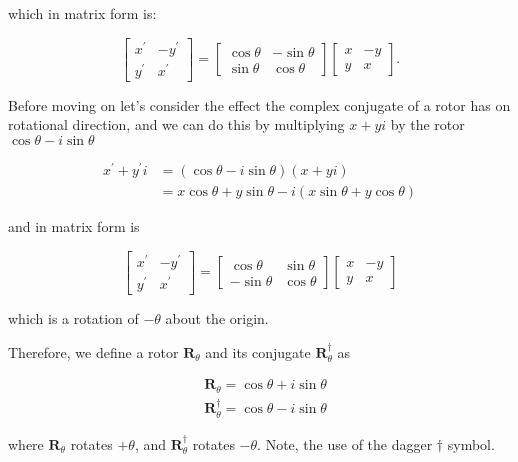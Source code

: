 which in matrix form is:

$$
\left[\begin{array}{cc}
x^{\prime} & -y^{\prime} \\
y^{\prime} & x^{\prime}
\end{array}\right]=\left[\begin{array}{cc}
\cos \theta & -\sin \theta \\
\sin \theta & \cos \theta
\end{array}\right]\left[\begin{array}{cc}
x & -y \\
y & x
\end{array}\right] .
$$

Before moving on let's consider the effect the complex conjugate of a rotor has on rotational direction, and we can do this by multiplying $x+y i$ by the rotor $\cos \theta-i \sin \theta$

$$
\begin{aligned}
x^{\prime}+y^{\prime} i & =(\cos \theta-i \sin \theta)(x+y i) \\
& =x \cos \theta+y \sin \theta-i(x \sin \theta+y \cos \theta)
\end{aligned}
$$

and in matrix form is

$$
\left[\begin{array}{cc}
x^{\prime} & -y^{\prime} \\
y^{\prime} & x^{\prime}
\end{array}\right]=\left[\begin{array}{cc}
\cos \theta & \sin \theta \\
-\sin \theta & \cos \theta
\end{array}\right]\left[\begin{array}{cc}
x & -y \\
y & x
\end{array}\right]
$$

which is a rotation of $-\theta$ about the origin.

Therefore, we define a rotor $\mathbf{R}_{\theta}$ and its conjugate $\mathbf{R}_{\theta}^{\dagger}$ as

$$
\begin{aligned}
& \mathbf{R}_{\theta}=\cos \theta+i \sin \theta \\
& \mathbf{R}_{\theta}^{\dagger}=\cos \theta-i \sin \theta
\end{aligned}
$$

where $\mathbf{R}_{\theta}$ rotates $+\theta$, and $\mathbf{R}_{\theta}^{\dagger}$ rotates $-\theta$. Note, the use of the dagger $\dagger$ symbol.

